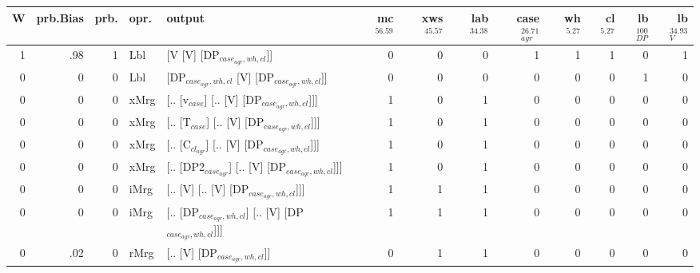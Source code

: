 \begin{tabularx}{\linewidth}{rrrlXrrrrrrrr}
\hline
   W &   prb.Bias &   prb. & opr.   & output                                                &   mc$^{56.59}$ &   xws$^{45.57}$ &   lab$^{34.38}$ &   case$_{agr}^{26.71}$ &   wh$^{5.27}$ &   cl$^{5.27}$ &   lb$_{DP}^{100}$ &   lb$_{V}^{34.93}$ \\
\hline
   1 &       .98 &   1 & Lbl  & [V [V] [DP$_{case_{agr},wh,cl}$]]                           &            0 &             0 &             0 &                  1 &           1 &           1 &                0 &              1 \\
   0 &       0 &   0 & Lbl  & [DP$_{case_{agr},wh,cl}$ [V] [DP$_{case_{agr},wh,cl}$]]           &            0 &             0 &             0 &                  0 &           0 &           0 &                1 &              0 \\
   0 &       0 &   0 & xMrg & [.. [v$_{case}$] [.. [V] [DP$_{case_{agr},wh,cl}$]]]            &            1 &             0 &             1 &                  0 &           0 &           0 &                0 &              0 \\
   0 &       0 &   0 & xMrg & [.. [T$_{case}$] [.. [V] [DP$_{case_{agr},wh,cl}$]]]            &            1 &             0 &             1 &                  0 &           0 &           0 &                0 &              0 \\
   0 &       0 &   0 & xMrg & [.. [C$_{cl_{agr}}$] [.. [V] [DP$_{case_{agr},wh,cl}$]]]          &            1 &             0 &             1 &                  0 &           0 &           0 &                0 &              0 \\
   0 &       0 &   0 & xMrg & [.. [DP2$_{case_{agr}}$] [.. [V] [DP$_{case_{agr},wh,cl}$]]]      &            1 &             0 &             1 &                  0 &           0 &           0 &                0 &              0 \\
   0 &       0 &   0 & iMrg & [.. [V] [.. [V] [DP$_{case_{agr},wh,cl}$]]]                 &            1 &             1 &             1 &                  0 &           0 &           0 &                0 &              0 \\
   0 &       0 &   0 & iMrg & [.. [DP$_{case_{agr},wh,cl}$] [.. [V] [DP$_{case_{agr},wh,cl}$]]] &            1 &             1 &             1 &                  0 &           0 &           0 &                0 &              0 \\
   0 &       .02 &   0 & rMrg & [.. [V] [DP$_{case_{agr},wh,cl}$]]                          &            0 &             1 &             1 &                  0 &           0 &           0 &                0 &              0 \\
\hline
\end{tabularx}\endgroup\\
